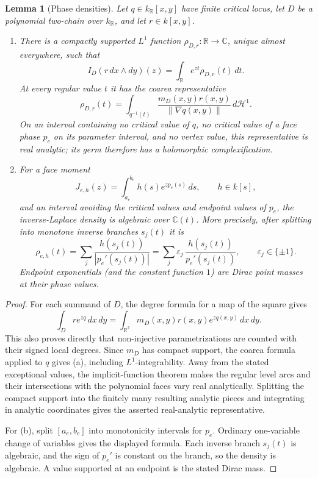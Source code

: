 \documentclass[11pt]{article}
\numberwithin{equation}{section}
\newtheorem{lemma}[lemma]{Lemma}
\theoremstyle{definition}
\theoremstyle{remark}
\newcommand{\C}{\mathbb C}
\newcommand{\R}{\mathbb R}
\begin{document}
\begin{lemma}[Phase densities]\label{lem:phase-density}
Let $q\in k_\R[x,y]$ have finite critical locus, let $D$ be a polynomial
two-chain over $k_\R$, and let $r\in k[x,y]$.
\begin{enumerate}[label=\textup{(\alph*)},leftmargin=2.2em]
\item There is a compactly supported $L^1$ function
$\rho_{D,r}:\R\to\C$, unique almost everywhere, such that
\[
 I_D(r\,dx\wedge dy)(z)
 =\int_\R e^{zt}\rho_{D,r}(t)\,dt.
\]
At every regular value $t$ it has the coarea representative
\[
 \rho_{D,r}(t)=
 \int_{q^{-1}(t)}
 \frac{m_D(x,y)r(x,y)}{\|\nabla q(x,y)\|}
 \,d\mathcal H^1.
\]
On an interval containing no critical value of $q$, no critical value
of a face phase $p_e$ on its parameter interval, and no vertex value,
this representative is real analytic; its germ therefore has a
holomorphic complexification.
\item For a face moment
\[
 J_{e,h}(z)=\int_{a_e}^{b_e}h(s)e^{zp_e(s)}\,ds,
 \qquad h\in k[s],
\]
and an interval avoiding the critical values and endpoint values of
$p_e$, the inverse-Laplace density is algebraic over $\C(t)$.  More
precisely, after splitting into monotone inverse branches $s_j(t)$ it is
\[
 \rho_{e,h}(t)=
 \sum_j \frac{h(s_j(t))}{|p_e'(s_j(t))|}
 =\sum_j \varepsilon_j\,
   \frac{h(s_j(t))}{p_e'(s_j(t))},
 \qquad \varepsilon_j\in\{\pm1\}.
\]
Endpoint exponentials (and the constant function $1$) are Dirac point
masses at their phase values.
\end{enumerate}
\end{lemma}
\begin{proof}
For each summand of $D$, the degree formula for a map of the square gives
\[
 \int_D r e^{zq}\,dx\,dy
 =\int_{\R^2}m_D(x,y)r(x,y)e^{zq(x,y)}\,dx\,dy.
\]
This also proves directly that non-injective parametrizations are counted
with their signed local degrees.  Since $m_D$ has compact support, the
coarea formula applied to $q$ gives (a), including $L^1$-integrability.
Away from the stated exceptional values, the implicit-function theorem
makes the regular level arcs and their intersections with the polynomial
faces vary real analytically.  Splitting the compact support into the
finitely many resulting analytic pieces and integrating in analytic
coordinates gives the asserted real-analytic representative.

For (b), split $[a_e,b_e]$ into monotonicity intervals for $p_e$.
Ordinary one-variable change of variables gives the displayed formula.
Each inverse branch $s_j(t)$ is algebraic, and the sign of $p_e'$ is
constant on the branch, so the density is algebraic.  A value supported
at an endpoint is the stated Dirac mass.
\end{proof}
\end{document}
